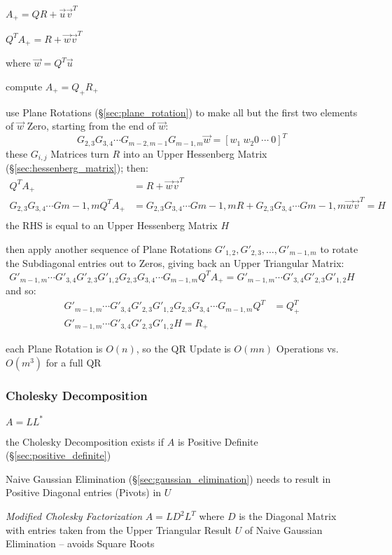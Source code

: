 $A_+ = QR + \vec{u}\vec{v}^T$

$Q^T A_+ = R + \vec{w}\vec{v}^T$

where $\vec{w} = Q^T\vec{u}$

compute $A_+ = Q_+ R_+$

use Plane Rotations (\S\ref{sec:plane_rotation}) to make all but the first two
elements of $\vec{w}$ Zero, starting from the end of $\vec{w}$:
\[
  G_{2,3}G_{3,4}\cdots G_{m-2,m-1}G_{m-1,m} \vec{w} = [w_1 \ w_2 0 \ \cdots \ 0]^T
\]
these $G_{i,j}$ Matrices turn $R$ into an Upper Hessenberg Matrix
(\S\ref{sec:hessenberg_matrix}); then:
\begin{align*}
  Q^T A_+ & = R + \vec{w}\vec{v}^T \\
  G_{2,3}G_{3,4}\cdots G{m-1,m} Q^T A_+ & =
    G_{2,3}G_{3,4}\cdots G{m-1,m} R +
    G_{2,3}G_{3,4}\cdots G{m-1,m} \vec{w}\vec{v}^T  = H\\
\end{align*}
the RHS is equal to an Upper Hessenberg Matrix $H$

then apply another sequence of Plane Rotations $G'_{1,2}, G'_{2,3}, \ldots,
G'_{m-1,m}$ to rotate the Subdiagonal entries out to Zeros, giving back an
Upper Triangular Matrix:
\[
  G'_{m-1,m}\cdots G'_{3,4}G'_{2,3}G'_{1,2}G_{2,3}G_{3,4}\cdots G_{m-1,m}
    Q^T A_+ =
  G'_{m-1,m}\cdots G'_{3,4}G'_{2,3}G'_{1,2}H
\]
and so:
\begin{align*}
  G'_{m-1,m}\cdots G'_{3,4}G'_{2,3}G'_{1,2}G_{2,3}G_{3,4}\cdots G_{m-1,m} Q^T
    & = Q_+^T \\
  G'_{m-1,m}\cdots G'_{3,4}G'_{2,3}G'_{1,2}H = R_+
\end{align*}

each Plane Rotation is $O(n)$, so the QR Update is $O(mn)$ Operations vs.
$O(m^3)$ for a full QR



\subsubsection{Cholesky Decomposition}\label{sec:cholesky_decomposition}

$A = LL^*$

the Cholesky Decomposition exists if $A$ is Positive Definite
(\S\ref{sec:positive_definite})

Naive Gaussian Elimination (\S\ref{sec:gaussian_elimination}) needs to result
in Positive Diagonal entries (Pivots) in $U$

\emph{Modified Cholesky Factorization} $A = L D^2 L^T$ where $D$ is the
Diagonal Matrix with entries taken from the Upper Triangular Result $U$ of
Naive Gaussian Elimination -- avoids Square Roots

